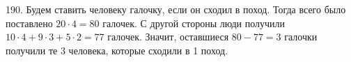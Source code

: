 190. Будем ставить человеку галочку, если он сходил в поход. Тогда всего было поставлено $20\cdot4=80$ галочек. С другой стороны люди получили $10\cdot4+9\cdot3+5\cdot2=77$ галочек. Значит, оставшиеся $80-77=3$ галочки получили те 3 человека, которые сходили в 1 поход.\\
